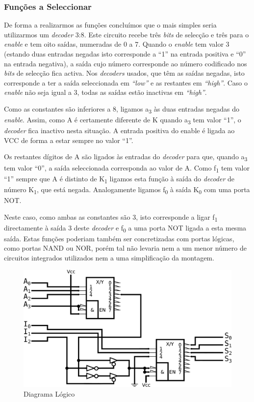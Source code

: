 \documentclass[a4paper,12pt]{article}
\begin{document}
\subsubsection{Funções a Seleccionar}
De forma a realizarmos as funções concluímos que o mais simples seria utilizarmos um {\it decoder} 3:8. Este circuito recebe três {\it bits} de selecção e três para o {\it enable} e tem oito saídas, numeradas de 0 a 7. Quando o {\it enable} tem valor 3 (estando duas entradas negadas isto corresponde a ``1'' na entrada positiva e ``0'' na entrada negativa), a saída cujo número corresponde ao número codificado nos {\it bits} de selecção fica activa. Nos {\it decoders} usados, que têm as saídas negadas, isto corresponde a ter a saída seleccionada em {\it ``low''} e as restantes em {\it ``high''}. Caso o {\it enable} não seja igual a 3, todas as saídas estão inactivas em  {\it ``high''}.
\par
Como as constantes são inferiores a 8, ligamos a\textsubscript{3} às duas entradas negadas do {\it enable}. Assim, como A é certamente diferente de K quando a\textsubscript{3} tem valor ``1'', o {\it decoder} fica inactivo nesta situação. A entrada positiva do enable é ligada ao VCC de forma a estar sempre no valor ``1''. 
\par
Os restantes dígitos de A são ligados às entradas do {\it decoder} para que, quando a\textsubscript{3} tem valor ``0'', a saída seleccionada corresponda ao valor de A. Como f\textsubscript{1} tem valor ``1''  sempre que A é distinto de K\textsubscript{1} ligamos esta função à saída do {\it decoder} de número K\textsubscript{1}, que está negada. Analogamente ligamos f\textsubscript{0} à saída K\textsubscript{0} com uma porta NOT.
\par
Neste caso, como ambas as constantes são 3, isto corresponde a ligar f\textsubscript{1} directamente à saída 3 deste {\it decoder} e f\textsubscript{0} a uma porta NOT ligada a esta mesma saída. Estas funções poderiam também ser concretizadas com portas lógicas, como portas NAND ou NOR, porém tal não levaria nem a um menor número de circuitos integrados utilizados nem a uma simplificação da montagem.
\par

\begin{figure}
\centering
\includegraphics[scale=.1]{logigrama.eps}
\caption{Diagrama Lógico}
\end{figure}
\par
\par
\end{document}
